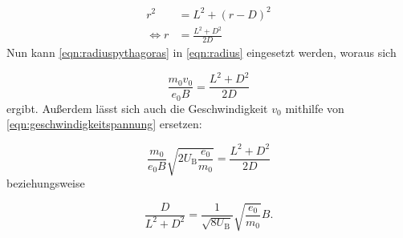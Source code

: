 \begin{equation}
\begin{aligned}
r^2 &= L^2 + (r-D)^2 \\
\iff r &= \frac{L^2 + D^2}{2D}
\label{eqn:radiuspythagoras}
\end{aligned}
\end{equation}
Nun kann \ref{eqn:radiuspythagoras} in \ref{eqn:radius} eingesetzt werden, woraus sich

\begin{equation}
\frac{m_0 v_0}{e_0 B} = \frac{L^2 + D^2}{2D} 
\end{equation}
ergibt. Außerdem lässt sich auch die Geschwindigkeit $v_0$ mithilfe von \ref{eqn:geschwindigkeitspannung} ersetzen:

\begin{equation}
\frac{m_0}{e_0 B} \sqrt{2 U_{\text{B}} \frac{e_0}{m_0}} = \frac{L^2 + D^2}{2D}
\end{equation}
beziehungsweise

\begin{equation}
\frac{D}{L^2 + D^2} = \frac{1}{\sqrt{8 U_{\text{B}}}} \sqrt{\frac{e_0}{m_0}} B.
\end{equation}
